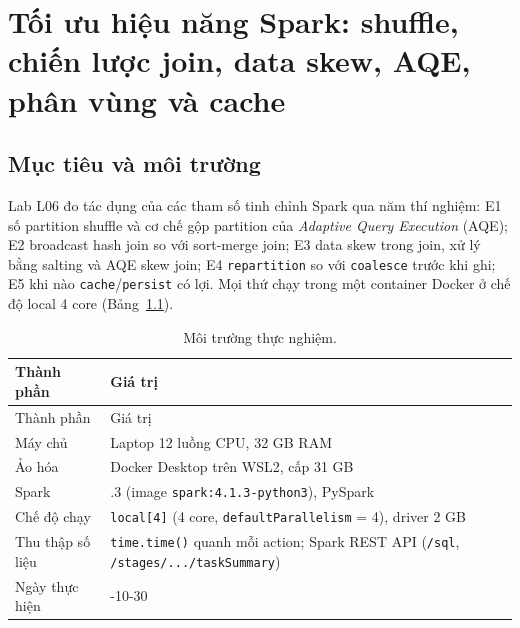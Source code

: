 \documentclass[
  12pt,
  a4paper,
]{report}
\begin{document}
\chapter{Tối ưu hiệu năng Spark: shuffle, chiến lược join, data skew,
AQE, phân vùng và cache}\label{sec:l06}

\section{Mục tiêu và môi trường}\label{sec:l06-intro}

Lab L06 đo tác dụng của các tham số tinh chỉnh Spark qua năm thí nghiệm:
E1 số partition shuffle và cơ chế gộp partition của \emph{Adaptive Query
Execution} (AQE); E2 broadcast hash join so với sort-merge join; E3 data
skew trong join, xử lý bằng salting và AQE skew join; E4
\texttt{repartition} so với \texttt{coalesce} trước khi ghi; E5 khi nào
\texttt{cache}/\texttt{persist} có lợi. Mọi thứ chạy trong một container
Docker ở chế độ local 4 core (Bảng~\ref{tbl:l06-env}).

\begin{longtable}[]{@{}
  >{\raggedright\arraybackslash}p{}
  >{\raggedright\arraybackslash}p{}@{}}
\caption{\label{tbl:l06-env}Môi trường thực nghiệm.}\tabularnewline
\toprule\noalign{}
\begin{minipage}[b]{\linewidth}\raggedright
Thành phần
\end{minipage} & \begin{minipage}[b]{\linewidth}\raggedright
Giá trị
\end{minipage} \\
\midrule\noalign{}
\endfirsthead
\toprule\noalign{}
\begin{minipage}[b]{\linewidth}\raggedright
Thành phần
\end{minipage} & \begin{minipage}[b]{\linewidth}\raggedright
Giá trị
\end{minipage} \\
\midrule\noalign{}
\endhead
\bottomrule\noalign{}
\endlastfoot
Máy chủ & Laptop 12 luồng CPU, 32 GB RAM \\
Ảo hóa & Docker Desktop trên WSL2, cấp 31 GB \\
Spark & 4.1.3 (image
\texttt{spark:}\allowbreak{}\texttt{4.}\allowbreak{}\texttt{1.}\allowbreak{}\texttt{3-python3}\allowbreak{}),
PySpark \\
Chế độ chạy & \texttt{local{[}4{]}} (4 core,
\texttt{defaultParallelism}\allowbreak{} = 4), driver 2 GB \\
Thu thập số liệu & \texttt{time.time()} quanh mỗi action; Spark REST API
(\texttt{/sql},
\texttt{/}\allowbreak{}\texttt{stages/}\allowbreak{}\texttt{.}\allowbreak{}\texttt{.}\allowbreak{}\texttt{.}\allowbreak{}\texttt{/}\allowbreak{}\texttt{taskSummary}\allowbreak{}) \\
Ngày thực hiện & 2026-10-30 \\
\end{longtable}
\end{document}
